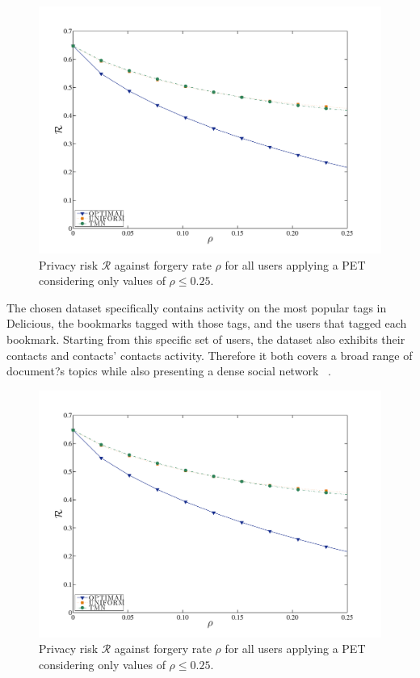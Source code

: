 \begin{figure}[htb]  
\includegraphics[width=\textwidth]{figures/Fig6a.pdf}
\caption[Privacy Risk against forgery rate.]{Privacy risk $\mathcal{R}$ against forgery rate $\rho$ for all users applying a PET considering only values of $\rho\leqslant 0.25$.
\label{fig:Risk-Rho-Small}}
\end{figure}

The chosen dataset specifically contains activity on the most popular tags in Delicious, the bookmarks tagged with those tags, and the users that tagged each bookmark. Starting from this specific set of users, the dataset also exhibits their contacts and contacts' contacts activity. Therefore it both covers a broad range of document?s topics while also presenting a dense social network ~\cite{a22}.

\begin{figure}[htb]  
\includegraphics[width=\textwidth]{figures/Fig6a.pdf}
\caption[Privacy Risk against forgery rate for all users.]{Privacy risk $\mathcal{R}$ against forgery rate $\rho$ for all users applying a PET considering only values of $\rho\leqslant 0.25$.
\label{fig:Risk-Rho-Small}}
\end{figure}

